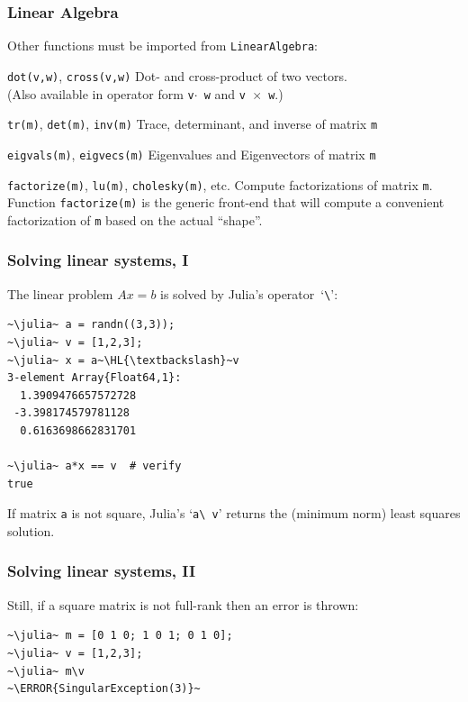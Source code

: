 \documentclass[english,serif,mathserif,xcolor=pdftex,dvipsnames,table]{beamer}
\begin{document}
\begin{frame}
  \frametitle{Linear Algebra}
  Other functions must be imported from \texttt{LinearAlgebra}:
  \smaller

  \+
  \begin{describe}{\texttt{dot(v,w)}, \texttt{cross(v,w)}}
      Dot- and cross-product of two vectors. \\
      (Also available in operator form \texttt{v$\cdot$ w} and \texttt{v
        $\times$ w}.)
  \end{describe}

  \+
  \begin{describe}{\texttt{tr(m)}, \texttt{det(m)}, \texttt{inv(m)}}
    Trace, determinant, and inverse of matrix \texttt{m}
  \end{describe}

  \+
  \begin{describe}{\texttt{eigvals(m)}, \texttt{eigvecs(m)}}
    Eigenvalues and Eigenvectors of matrix \texttt{m}
  \end{describe}

  \+
  \begin{describe}{\texttt{factorize(m)}, \texttt{lu(m)},
      \texttt{cholesky(m)}, etc.}
  Compute factorizations of matrix \texttt{m}.
  Function \texttt{factorize(m)} is the generic front-end that will
  compute a convenient factorization of \texttt{m}
  based on the actual ``shape''.
  \end{describe}
\end{frame}


\begin{frame}[fragile]
  \frametitle{Solving linear systems, I}
  The linear problem $Ax = b$ is solved by Julia's
  operator~`\texttt{\textbackslash}':
\begin{lstlisting}
~\julia~ a = randn((3,3));
~\julia~ v = [1,2,3];
~\julia~ x = a~\HL{\textbackslash}~v
3-element Array{Float64,1}:
  1.3909476657572728
 -3.398174579781128
  0.6163698662831701

~\julia~ a*x == v  # verify
true
\end{lstlisting}

 If matrix \texttt{a} is not square, Julia's `\texttt{a\textbackslash
   v}' returns the (minimum norm) least squares solution.
\end{frame}

\begin{frame}
  \frametitle{Solving linear systems, II}
  Still, if a square matrix is not full-rank then an error is thrown:
\begin{lstlisting}
~\julia~ m = [0 1 0; 1 0 1; 0 1 0];
~\julia~ v = [1,2,3];
~\julia~ m\v
~\ERROR{SingularException(3)}~
\end{lstlisting}
\end{frame}
\end{document}
